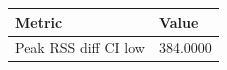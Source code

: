 \begin{tabular}{ll}
\hline
Metric & Value \\
\hline
Peak RSS diff CI low & 384.0000 \\
\hline
\end{tabular}
